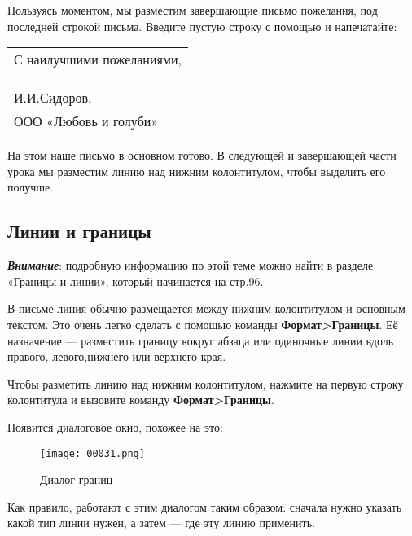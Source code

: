 \documentclass[a4paper,10pt]{article}
\begin{document}
Пользуясь моментом, мы разместим завершающие письмо пожелания, под последней строкой письма. Введите пустую строку с помощью \keys{\return} и напечатайте:

\begin{center}
\begin{tabular}{ | m{15cm} | }
\hline
С наилучшими пожеланиями,\keys{\return}\\
\keys{\return}\\
\keys{\return}\\
\keys{\return}\\
И.И.Сидоров,\keys{\return}\\
ООО «Любовь и голуби»\keys{\return}\\
\hline
\end{tabular}
\end{center}

На этом наше письмо в основном готово. В следующей и завершающей части урока мы разместим линию над нижним колонтитулом, чтобы выделить его получше.

\subsection{Линии и границы}
\textbf{\textit{Внимание}}: подробную информацию по этой теме можно найти в разделе «Границы и линии», который начинается на стр.96.

В письме линия обычно размещается между нижним колонтитулом и основным текстом. Это очень легко сделать с помощью команды \textbf{Формат>Границы}. Её назначение — разместить границу вокруг абзаца или одиночные линии вдоль правого, левого,нижнего или верхнего края.

Чтобы разметить линию над нижним колонтитулом, нажмите на первую строку колонтитула и вызовите команду \textbf{Формат>Границы}.

Появится диалоговое окно, похожее на это:

\begin{figure}[ht]
\texttt{[image: 00031.png]}
\centering
\caption{Диалог границ}
\end{figure}

Как правило, работают с этим диалогом таким образом: сначала нужно указать какой тип линии нужен, а затем — где эту линию применить.
\end{document}
